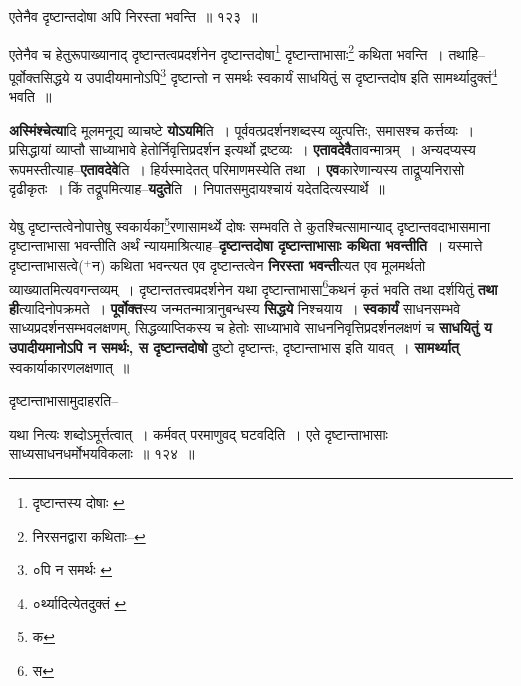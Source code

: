 \documentclass[article,12pt,a4paper]{memoir}
\newcommand{\add}[1]{($^{+}$#1)}
\begin{document}
	  \bigskip
	  \begingroup
	

	  \pstart एतेनैव दृष्टान्तदोषा अपि निरस्ता भवन्ति ॥ १२३ ॥
	\pend
      
	  \endgroup
	 

	  \pstart एतेनैव च हेतुरूपाख्यानाद् दृष्टान्तत्वप्रदर्शनेन दृष्टान्तदोषा\footnote{दृष्टान्तस्य दोषाः \cite{dp-msA} \cite{dp-edP} \cite{dp-edH} \cite{dp-edE} \cite{dp-edN}} दृष्टान्ताभासाः\footnote{निरसनद्वारा कथिताः--\cite{dp-msD-n}} कथिता भवन्ति । तथाहि--पूर्वोक्तसिद्धये य उपादीयमानोऽपि\footnote{०पि न समर्थः \cite{dp-msB}} दृष्टान्तो न समर्थः स्वकार्यं साधयितुं स दृष्टान्तदोष इति सामर्थ्यादुक्तं\footnote{०र्थ्यादित्येतदुक्तं \cite{dp-msB}} भवति ॥
	\pend
      
	  \endgroup
	

	  \pstart \textbf{अस्मिंश्चेत्या}दि मूलमनूद्य व्याचष्टे \textbf{योऽयमि}ति । पूर्ववत्प्रदर्शनशब्दस्य व्युत्पत्तिः, समासश्च कर्त्तव्यः । प्रसिद्धायां व्याप्तौ साध्या\leavevmode{}भावे हेतोर्निवृत्तिप्रदर्शन इत्यर्थो द्रष्टव्यः । \textbf{एतावदेवै}तावन्मात्रम् । अन्यदप्यस्य रूपमस्तीत्याह--\textbf{एतावदेवे}ति । हिर्यस्मादेतत् परिमाणमस्येति तथा । \textbf{एव}कारेणान्यस्य ताद्रूप्यनिरासो दृढीकृतः । किं तद्रूपमित्याह--\textbf{यदुते}ति । निपातसमुदायश्चायं यदेतदित्यस्यार्थे ॥
	\pend
      

	  \pstart येषु दृष्टान्तत्वेनोपात्तेषु स्वकार्यका\footnote{क}रणासामर्थ्ये दोषः सम्भवति ते कुतश्चित्सामान्याद् दृष्टान्तवदाभासमाना दृष्टान्ताभासा भवन्तीति अर्थं न्यायमाश्रित्याह--\textbf{दृष्टान्तदोषा दृष्टान्ताभासाः कथिता भवन्तीति} । यस्मात्ते दृष्टान्ताभासत्वे\add{न} कथिता भवन्त्यत एव दृष्टान्तत्वेन \textbf{निरस्ता भवन्ती}त्यत एव मूलमर्थतो व्याख्यातमित्यवगन्तव्यम् । दृष्टान्ततत्त्वप्रदर्शनेन यथा दृष्टान्ताभासा\footnote{स}कथनं कृतं भवति तथा दर्शयितुं \textbf{तथा ही}त्यादिनोपक्रमते । \textbf{पूर्वोक्त}स्य जन्मतन्मात्रानुबन्धस्य \textbf{सिद्धये} निश्चयाय । \textbf{स्वकार्यं} साधनसम्भवे साध्यप्रदर्शनसम्भवलक्षणम्, सिद्धव्याप्तिकस्य च हेतोः साध्याभावे साधननिवृत्तिप्रदर्शनलक्षणं च \textbf{साधयितुं य उपादीयमानोऽपि न समर्थः, स दृष्टान्तदोषो} दुष्टो दृष्टान्तः, दृष्टान्ताभास इति यावत् । \textbf{सामर्थ्यात्} स्वकार्याकारणलक्षणात् ॥
	\pend
      \leavevmode{}
	  \bigskip
	  \begingroup
	

	  \pstart दृष्टान्ताभासामुदाहरति--
	\pend
       
	  \bigskip
	  \begingroup
	

	  \pstart यथा नित्यः शब्दोऽमूर्त्तत्वात् । कर्मवत् परमाणुवद् घटवदिति । एते दृष्टान्ताभासाः साध्यसाधनधर्मोभयविकलाः ॥ १२४ ॥
	\pend
      
\end{document}

